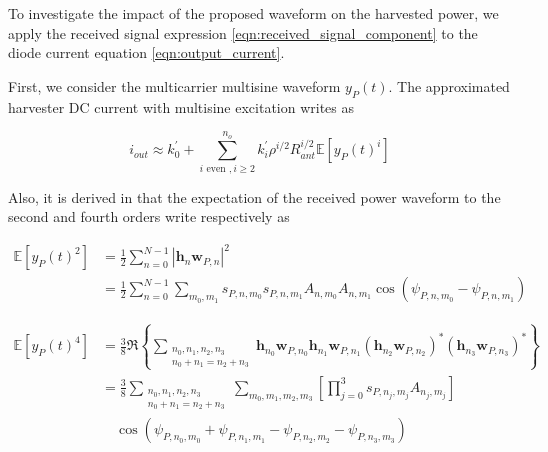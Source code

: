 To investigate the impact of the proposed waveform on the harvested power, we apply the received signal expression \ref{eqn:received_signal_component} to the diode current equation \ref{eqn:output_current}.

First, we consider the multicarrier multisine waveform ${y_P}(t)$. The approximated harvester DC current with multisine excitation writes as

\begin{equation}\label{eqn:current_power}
  {i_{out}} \approx k_0^\prime  + \sum\limits_{i{\text{ even }},i \geqslant 2}^{{n_o}} {k_i^\prime } {\rho ^{i/2}}R_{ant}^{i/2}\mathbb{E}\left[ {{y_P}{{(t)}^i}} \right]
\end{equation}

Also, it is derived in \cite{Clerckx2016} that the expectation of the received power waveform to the second and fourth orders write respectively as

\begin{align}\label{eqn:power_waveform_second_order}
  \mathbb{E}\left[ {{y_P}{{(t)}^2}} \right] &= \frac{1}{2}\sum\limits_{n = 0}^{N - 1} {{{\left| {{{\mathbf{h}}_n}{{\mathbf{w}}_{P,n}}} \right|}^2}}  \\
   &= \frac{1}{2}\sum\limits_{n = 0}^{N - 1} {\sum\limits_{{m_0},{m_1}} {{s_{P,n,{m_0}}}{s_{P,n,{m_1}}}{A_{n,{m_0}}}{A_{n,{m_1}}}\cos \left( {{\psi _{P,n,{m_0}}} - {\psi _{P,n,{m_1}}}} \right)} }
\end{align}

\begin{align}\label{eqn:power_waveform_fourth_order}
  \mathbb{E}\left[ {{y_P}{{(t)}^4}} \right] &= \frac{3}{8}\Re \left\{ {\sum\limits_{\substack{{n_0},{n_1},{n_2},{n_3} \\ {n_0} + {n_1} = {n_2} + {n_3}}} {{{\mathbf{h}}_{{n_0}}}{{\mathbf{w}}_{P,{n_0}}}{{\mathbf{h}}_{{n_1}}}{{\mathbf{w}}_{P,{n_1}}}{{\left( {{{\mathbf{h}}_{{n_2}}}{{\mathbf{w}}_{P,{n_2}}}} \right)}^*}{{\left( {{{\mathbf{h}}_{{n_3}}}{{\mathbf{w}}_{P,{n_3}}}} \right)}^*}} } \right\} \\
   &= \frac{3}{8}\sum\limits_{\substack{{n_0},{n_1},{n_2},{n_3} \\ {n_0} + {n_1} = {n_2} + {n_3}}} {\sum\limits_{{m_0},{m_1},{m_2},{m_3}} {\left[ {\prod\limits_{j = 0}^3 {{s_{{P},{n_j},{m_j}}}} {A_{{n_j},{m_j}}}} \right] }} \nonumber \\
   &\quad \cos \left( {{\psi _{{P},{n_0},{m_0}}} + {\psi _{{P},{n_1},{m_1}}} - {\psi _{{P},{n_2},{m_2}}} - {\psi _{{P},{n_3},{m_3}}}} \right)
\end{align}

